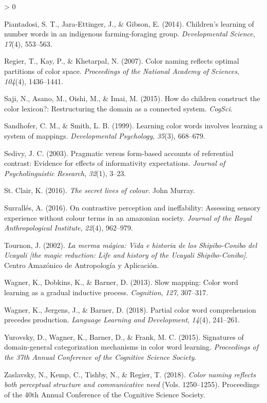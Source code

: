 \documentclass[
  english,
  ,apa7,floatsintext]{apa6}
\newlength{\cslhangindent}
\newenvironment{CSLReferences}[2] %
 {%
  \setlength{\parindent}{0pt}
  \ifodd #1 \everypar{\setlength{\hangindent}{\cslhangindent}}\ignorespaces\fi
  \ifnum #2 > 0
  \setlength{\parskip}{#2\baselineskip}
  \fi
 }%
 {}
\begin{document}
\begin{CSLReferences}{1}{0}
\leavevmode\hypertarget{ref-piantadosi2014}{}%
Piantadosi, S. T., Jara‐Ettinger, J., \& Gibson, E. (2014). Children's learning of number words in an indigenous farming‐foraging group. \emph{Developmental Science}, \emph{17}(4), 553--563.

\leavevmode\hypertarget{ref-regier2007}{}%
Regier, T., Kay, P., \& Khetarpal, N. (2007). Color naming reflects optimal partitions of color space. \emph{Proceedings of the National Academy of Sciences}, \emph{104}(4), 1436--1441.

\leavevmode\hypertarget{ref-saji2015}{}%
Saji, N., Asano, M., Oishi, M., \& Imai, M. (2015). How do children construct the color lexicon?: Restructuring the domain as a connected system. \emph{CogSci}.

\leavevmode\hypertarget{ref-sandhofer1999}{}%
Sandhofer, C. M., \& Smith, L. B. (1999). Learning color words involves learning a system of mappings. \emph{Developmental Psychology}, \emph{35}(3), 668--679.

\leavevmode\hypertarget{ref-sedivy2003}{}%
Sedivy, J. C. (2003). Pragmatic versus form-based accounts of referential contrast: Evidence for effects of informativity expectations. \emph{Journal of Psycholinguistic Research}, \emph{32}(1), 3--23.

\leavevmode\hypertarget{ref-stclair2016}{}%
St. Clair, K. (2016). \emph{The secret lives of colour}. John Murray.

\leavevmode\hypertarget{ref-surralles2016}{}%
Surrallés, A. (2016). On contrastive perception and ineffability: Assessing sensory experience without colour terms in an amazonian society. \emph{Journal of the Royal Anthropological Institute}, \emph{22}(4), 962--979.

\leavevmode\hypertarget{ref-tournon2002}{}%
Tournon, J. (2002). \emph{La merma m{á}gica: Vida e historia de los {S}hipibo-{C}onibo del {U}cayali {[}the magic reduction: Life and history of the {U}cayali {S}hipibo-{C}onibo{]}}. Centro Amaz{ó}nico de Antropolog{í}a y Aplicaci{ó}n.

\leavevmode\hypertarget{ref-wagner2013}{}%
Wagner, K., Dobkins, K., \& Barner, D. (2013). Slow mapping: Color word learning as a gradual inductive process. \emph{Cognition}, \emph{127}, 307--317.

\leavevmode\hypertarget{ref-wagner2018}{}%
Wagner, K., Jergens, J., \& Barner, D. (2018). Partial color word comprehension precedes production. \emph{Language Learning and Development}, \emph{14}(4), 241--261.

\leavevmode\hypertarget{ref-yurovsky2015}{}%
Yurovsky, D., Wagner, K., Barner, D., \& Frank, M. C. (2015). Signatures of domain-general categorization mechanisms in color word learning. \emph{Proceedings of the 37th Annual Conference of the Cognitive Science Society}.

\leavevmode\hypertarget{ref-zaslavsky2018}{}%
Zaslavsky, N., Kemp, C., Tishby, N., \& Regier, T. (2018). \emph{Color naming reflects both perceptual structure and communicative need} (Vols. 1250--1255). Proceedings of the 40th Annual Conference of the Cognitive Science Society.

\end{CSLReferences}

\endgroup
\end{document}
